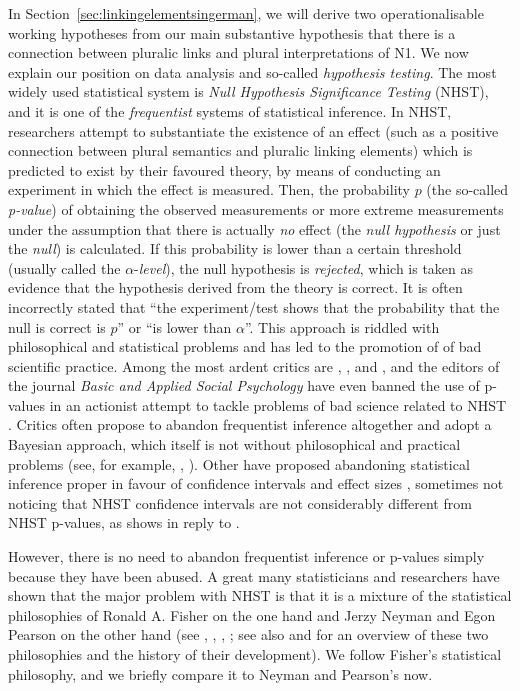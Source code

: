 In Section~\ref{sec:linkingelementsingerman}, we will derive two operationalisable working hypotheses from our main substantive hypothesis that there is a connection between pluralic links and plural interpretations of N1.
We now explain our position on data analysis and so-called \textit{hypothesis testing}.
The most widely used statistical system is \textit{Null Hypothesis Significance Testing} (NHST), and it is one of the \textit{frequentist} systems of statistical inference.
In NHST, researchers attempt to substantiate the existence of an effect (such as a positive connection between plural semantics and pluralic linking elements) which is predicted to exist by their favoured theory, by means of conducting an experiment in which the effect is measured.
Then, the probability $p$ (the so-called \textit{p-value}) of obtaining the observed measurements or more extreme measurements under the assumption that there is actually \textit{no} effect (the \textit{null hypothesis} or just the \textit{null}) is calculated.
If this probability is lower than a certain threshold (usually called the $\alpha$-\textit{level}), the null hypothesis is \textit{rejected}, which is taken as evidence that the hypothesis derived from the theory is correct.
It is often incorrectly stated that ``the experiment\slash test shows that the probability that the null is correct is $p$'' or ``is lower than $\alpha$''.
This approach is riddled with philosophical and statistical problems and has led to the promotion of of bad scientific practice.
Among the most ardent critics are \textcite{Gigerenzer2004}, \textcite{Colquhoun2014}, and \textcite{MunafoEa2017}, and the editors of the journal \textit{Basic and Applied Social Psychology} have even banned the use of p-values in an actionist attempt to tackle problems of bad science related to NHST \parencite{TrafimowMarks2016}.
Critics often propose to abandon frequentist inference altogether and adopt a Bayesian approach, which itself is not without philosophical and practical problems (see, for example, \citealt{Mayo1996}, \citealt{Senn2011}).
Other have proposed abandoning statistical inference proper in favour of confidence intervals and effect sizes \parencite{Cumming2014}, sometimes not noticing that NHST confidence intervals are not considerably different from NHST p-values, as \textcite{Perezgonzalez2015b} shows in reply to \textcite{Cumming2014}.

However, there is no need to abandon frequentist inference or p-values simply because they have been abused.
A great many statisticians and researchers have shown that the major problem with NHST is that it is a mixture of the statistical philosophies of Ronald A. Fisher on the one hand and Jerzy Neyman and Egon Pearson on the other hand (see \citealt{Goodman2008}, \citealt{Perezgonzalez2014}, \citealt{Perezgonzalez2015}, \citealt{GreenlandEa2016}; see also \citealt{Lehmann1993} and \citealt{Lehmann2011} for an overview of these two philosophies and the history of their development).
We follow Fisher's statistical philosophy, and we briefly compare it to Neyman and Pearson's now.

